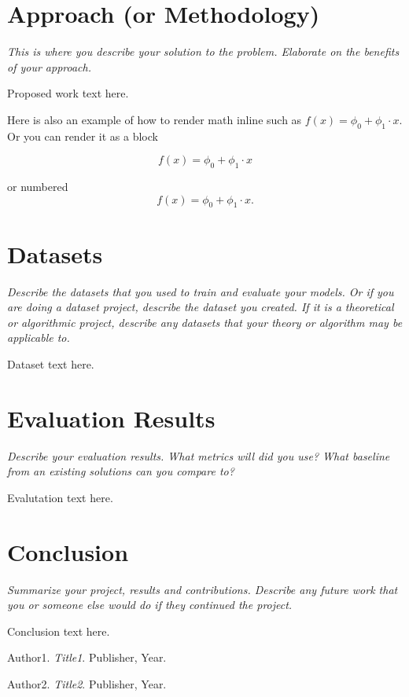 \documentclass[11pt, oneside]{article}   	%
\begin{document}
\section*{Approach (or Methodology)}

\textit{This is where you describe your  solution to the problem.
Elaborate on the benefits of your approach.}

Proposed work text here. 

Here is also an example of how to render math inline
such as \(f(x) = \phi_0 + \phi_1 \cdot x\). Or you can render it as a block

\[
f(x) = \phi_0 + \phi_1 \cdot x
\]

or numbered
\begin{equation}
f(x) = \phi_0 + \phi_1 \cdot x.
\end{equation}

\section*{Datasets}

\textit{Describe the datasets that you used to train and evaluate your
models. Or if you are doing a dataset project, describe the dataset you
created. If it is a theoretical
or algorithmic project, describe any datasets that your theory or algorithm
may be applicable to.}

Dataset text here.

\section*{Evaluation Results}

\textit{Describe your evaluation results. What metrics
will did you use? What baseline from an existing solutions can you compare to?}

Evalutation text here.


\section*{Conclusion}

\textit{Summarize your project, results and contributions. Describe any
future work that you or someone else would do if they continued the project.}

Conclusion text here.

\begin{thebibliography}{9}

Author1. 
\textit{Title1}.
Publisher, Year.

Author2. 
\textit{Title2}.
Publisher, Year.

\end{thebibliography}
\end{document}
